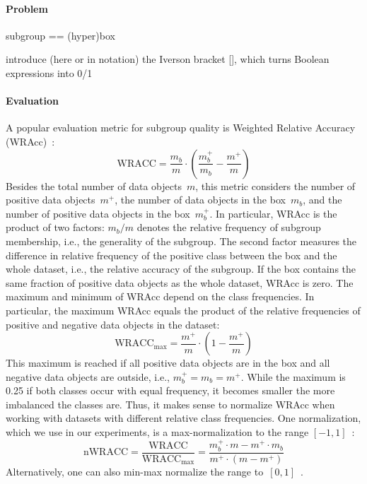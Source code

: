 \documentclass{article}
\theoremstyle{definition}
\begin{document}
\paragraph{Problem}

subgroup == (hyper)box

introduce (here or in notation) the Iverson bracket [], which turns Boolean expressions into 0/1

\paragraph{Evaluation}

A popular evaluation metric for subgroup quality is Weighted Relative Accuracy (WRAcc)~\cite{lavravc1999rule}:
%
\begin{equation}
	\text{WRACC} = \frac{m_b}{m} \cdot \left( \frac{m_b^+}{m_b} - \frac{m^+}{m} \right)
	\label{eq:csd:wracc}
\end{equation}
%
Besides the total number of data objects~$m$, this metric considers the number of positive data objects~$m^+$, the number of data objects in the box~$m_b$, and the number of positive data objects in the box~$m_b^+$.
In particular, WRAcc is the product of two factors:
$m_b / m$ denotes the relative frequency of subgroup membership, i.e., the generality of the subgroup.
The second factor measures the difference in relative frequency of the positive class between the box and the whole dataset, i.e., the relative accuracy of the subgroup.
If the box contains the same fraction of positive data objects as the whole dataset, WRAcc is zero.
The maximum and minimum of WRAcc depend on the class frequencies.
In particular, the maximum WRAcc equals the product of the relative frequencies of positive and negative data objects in the dataset:
%
\begin{equation}
	\text{WRACC}_{\text{max}} = \frac{m^+}{m} \cdot \left( 1 - \frac{m^+}{m} \right)
	\label{eq:csd:wracc-max}
\end{equation}
%
This maximum is reached if all positive data objects are in the box and all negative data objects are outside, i.e., $m_b^+ = m_b = m^+$.
While the maximum is 0.25 if both classes occur with equal frequency, it becomes smaller the more imbalanced the classes are.
Thus, it makes sense to normalize WRAcc when working with datasets with different relative class frequencies.
One normalization, which we use in our experiments, is a max-normalization to the range $[-1, 1]$~\cite{mathonat2021anytime}:
%
\begin{equation}
	\text{nWRACC} = \frac{\text{WRACC}}{\text{WRACC}_{\text{max}}} = \frac{m_b^+ \cdot m - m^+ \cdot m_b}{m^+ \cdot (m - m^+)}
	\label{eq:csd:wracc-normalized}
\end{equation}
%
Alternatively, one can also min-max normalize the range to~$[0, 1]$~\cite{carmona2018unifying}.
\end{document}
